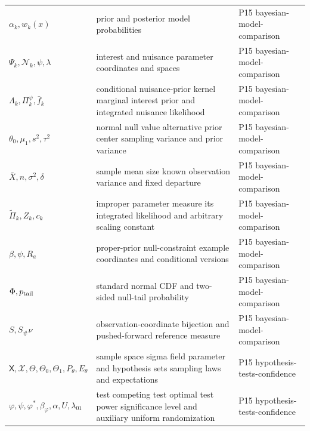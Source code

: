 \begin{longtable}{@{}p{}p{}p{}@{}}
\(\alpha_k,\allowbreak w_k(x)\) & prior and posterior model probabilities & P15 bayesian-\allowbreak{}model-\allowbreak{}comparison \\
\(\Psi_k,\allowbreak \mathcal N_k,\allowbreak \psi,\allowbreak \lambda\) & interest and nuisance parameter coordinates and spaces & P15 bayesian-\allowbreak{}model-\allowbreak{}comparison \\
\(\Lambda_k,\allowbreak \Pi_k^\psi,\allowbreak \bar f_k\) & conditional nuisance-prior kernel marginal interest prior and integrated nuisance likelihood & P15 bayesian-\allowbreak{}model-\allowbreak{}comparison \\
\(\theta_0,\allowbreak \mu_1,\allowbreak s^2,\allowbreak \tau^2\) & normal null value alternative prior center sampling variance and prior variance & P15 bayesian-\allowbreak{}model-\allowbreak{}comparison \\
\(\bar X,\allowbreak n,\allowbreak \sigma^2,\allowbreak \delta\) & sample mean size known observation variance and fixed departure & P15 bayesian-\allowbreak{}model-\allowbreak{}comparison \\
\(\widetilde\Pi_k,\allowbreak Z_k,\allowbreak c_k\) & improper parameter measure its integrated likelihood and arbitrary scaling constant & P15 bayesian-\allowbreak{}model-\allowbreak{}comparison \\
\(\beta,\allowbreak \psi,\allowbreak R_a\) & proper-prior null-constraint example coordinates and conditional versions & P15 bayesian-\allowbreak{}model-\allowbreak{}comparison \\
\(\Phi,\allowbreak p_{\rm tail}\) & standard normal CDF and two-sided null-tail probability & P15 bayesian-\allowbreak{}model-\allowbreak{}comparison \\
\(S,\allowbreak S_\#\nu\) & observation-coordinate bijection and pushed-forward reference measure & P15 bayesian-\allowbreak{}model-\allowbreak{}comparison \\
\(\mathsf X,\allowbreak \mathscr X,\allowbreak \Theta,\allowbreak \Theta_0,\allowbreak \Theta_1,\allowbreak P_\theta,\allowbreak E_\theta\) & sample space sigma field parameter and hypothesis sets sampling laws and expectations & P15 hypothesis-\allowbreak{}tests-\allowbreak{}confidence \\
\(\varphi,\allowbreak \psi,\allowbreak \varphi^*,\allowbreak \beta_\varphi,\allowbreak \alpha,\allowbreak U,\allowbreak \lambda_{01}\) & test competing test optimal test power significance level and auxiliary uniform randomization & P15 hypothesis-\allowbreak{}tests-\allowbreak{}confidence \\

\end{longtable}
